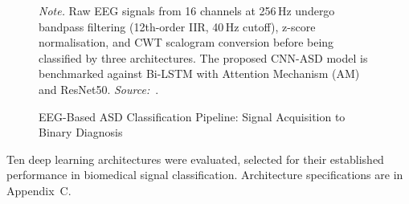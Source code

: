 \begin{figure}[!htbp]
    \vspace{0.5em}
    \caption[ASD Classification Pipeline]{EEG-Based ASD Classification Pipeline: Signal Acquisition to Binary Diagnosis}
    \label{fig:asd_classification_pipeline}
    \vspace{0.5em}
\noindent\textit{Note.} Raw EEG signals from 16 channels at 256\,Hz undergo bandpass filtering (12th-order IIR, 40\,Hz cutoff), z-score normalisation, and CWT scalogram conversion before being classified by three architectures. The proposed CNN-ASD model is benchmarked against Bi-LSTM with Attention Mechanism (AM) and ResNet50. \textit{Source:}~\cite{asthana2025asd}.
\end{figure}
\fi %



\noindent Ten deep learning architectures were evaluated, selected for their established performance in biomedical signal classification. Architecture specifications are in Appendix~C.


